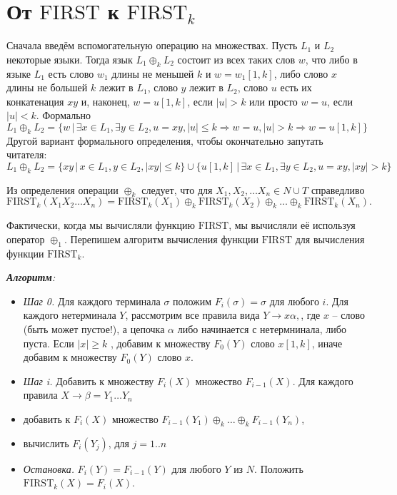 \documentclass[12pt]{article}
\theoremstyle{definiton}
\theoremstyle{definition}
\theoremstyle{definition}
\theoremstyle{definition}
\let\leq\leqslant
\let\geq\geqslant
\let\es\emptyset
\def\first{\mathrm{ FIRST} }
\begin{document}
\section{От $\first$ к $\first_k$}

Сначала введём вспомогательную операцию на множествах. Пусть $L_1$ и $L_2$ некоторые языки.  Тогда язык $L_1 \oplus_k L_2$ состоит из всех таких слов $w$, что либо в языке $L_1$ есть слово $w_1$ длины не меньшей $k$ и $w = w_1[1,k]$, либо слово $x$ длины не большей $k$ лежит в $L_1$, слово $y$ лежит в $L_2$, слово $u$ есть их конкатенация $xy$ и, наконец, $w = u[1,k]$, если $|u| > k$ или просто $w = u$, если $|u| < k$. Формально
$$
 	L_1 \oplus_k L_2 = \{ w\,|\, \exists x \in L_1, \exists y \in L_2, u = xy, |u| \leq k \Rightarrow w = u, |u| > k \Rightarrow w = u[1,k]  \}
$$ 
Другой вариант формального определения, чтобы окончательно запутать читателя:
$$
 	L_1 \oplus_k L_2 = \{ xy\,|\,  x \in L_1, y \in L_2,  |xy| \leq k   \} \cup \{ u[1,k] \,|\,  \exists x \in L_1, \exists y \in L_2, u = xy,  |xy| > k  \}
$$ 


Из определения операции $\oplus_k$ следует, что для $X_1, X_2,\ldots X_n \in N\cup T$ справедливо
 $$\first_k(X_1X_2\ldots X_n) = \first_k(X_1)\oplus_k \first_k(X_2)\oplus_k\ldots\oplus_k\first_k(X_n). $$ 

Фактически, когда мы вычисляли функцию $\first$, мы вычисляли её используя оператор $\oplus_1$. Перепишем алгоритм вычисления функции $\first$ для вычисления функции $\first_k$.

\begin{flushleft}
\emph{\textbf{Алгоритм}:} 
\end{flushleft}
\begin{itemize}
	\item[ ] \emph{Шаг 0.} Для каждого терминала $\sigma$ положим $F_i(\sigma) = \sigma$ для любого $i$. Для каждого нетерминала $Y$, рассмотрим все правила вида $Y \to x\alpha, $, где $x$ -- слово (быть может пустое!), а цепочка $\alpha$ либо начинается с нетермнинала, либо пуста. Если $|x| \geq k$ , добавим к множеству $F_0(Y) $ слово $ x[1,k]$, иначе добавим к множеству $F_0(Y) $ слово $x$.
	\item[ ] \emph{Шаг i.} Добавить к множеству $F_i(X)$ множество $F_{i-1}(X)$. Для каждого правила $X \to \beta = Y_1\ldots Y_n$
	\item[ ] \qquad добавить к $F_i(X)$ множество $F_{i-1}(Y_1)\oplus_k  \ldots \oplus_k F_{i-1}(Y_n)$, 
	\item[ ] \qquad вычислить $F_i(Y_j)$, для $j = 1..n$
	\item[ ] \emph{Остановка.} $F_i(Y) = F_{i-1}(Y)$ для любого $Y$ из $N$. Положить $\first_k(X) = F_i(X)$.
\end{itemize}
\end{document}
